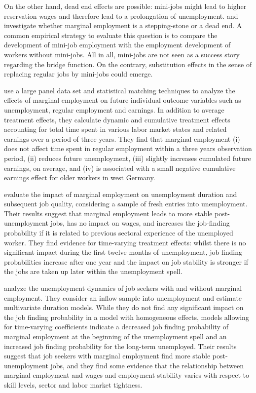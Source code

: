 \documentclass[12pt, a4paper]{article}
\begin{document}
On the other hand, dead end effects are possible: mini-jobs might lead to higher reservation wages and therefore lead to a prolongation of unemployment. \cite{Caliendo2012} and \cite{FreierSteiner07b} investigate whether marginal employment is a stepping-stone or a dead end. A common empirical strategy to evaluate this question is to compare the development of mini-job employment with the employment development of workers without mini-jobs. All in all, mini-jobs are not seen as a success story regarding the bridge function. On the contrary, substitution effects in the sense of replacing regular jobs by mini-jobs could emerge.

\cite{FreierSteiner07b} use a large panel data set and statistical matching techniques to analyze the effects of marginal employment on future individual outcome variables such as unemployment, regular employment and earnings. In addition to average treatment effects, they calculate dynamic and cumulative treatment effects accounting for total time spent in various labor market states and related earnings over a period of three years. They find that marginal employment (i) does not affect time spent in regular employment within a three years observation period, (ii) reduces future unemployment, (iii) slightly increases cumulated future earnings, on average, and (iv) is associated with a small negative cumulative earnings effect for older workers in west Germany.

\cite{Caliendo2012} evaluate the impact of marginal employment on unemployment duration and subsequent job quality, considering a sample of fresh entries into unemployment. Their results suggest that marginal employment leads to more stable post-unemployment jobs, has no impact on wages, and increases the job-finding probability if it is related to previous sectoral experience of the unemployed worker. They find evidence for time-varying treatment effects: whilst there is no significant impact during the first twelve months of unemployment, job finding probabilities increase after one year and the impact on job stability is stronger if the jobs are taken up later within the unemployment spell.

\cite{Caliendo2016} analyze the unemployment dynamics of job seekers with and without marginal employment. They consider an inflow sample into unemployment and estimate multivariate duration models. While they do not find any significant impact on the job finding probability in a model with homogeneous effects, models allowing for time-varying coefficients indicate a decreased job finding probability of marginal employment at the beginning of the unemployment spell and an increased job finding probability for the long-term unemployed. Their results suggest that job seekers with marginal employment find more stable post-unemployment jobs, and they find some evidence that the relationship between marginal employment and wages and employment stability varies with respect to skill levels, sector and labor market tightness.
\end{document}
